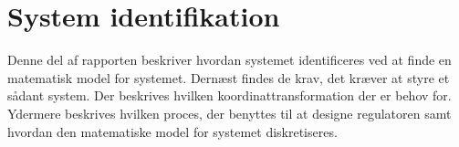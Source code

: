 \part{System identifikation}
Denne del af rapporten beskriver hvordan systemet identificeres ved at finde en 
matematisk model for systemet. Dernæst findes de krav, det kræver at styre et 
sådant system. Der beskrives hvilken koordinattransformation der er behov for.
Ydermere beskrives hvilken proces, der benyttes til at designe regulatoren samt 
hvordan den matematiske model for systemet diskretiseres.



